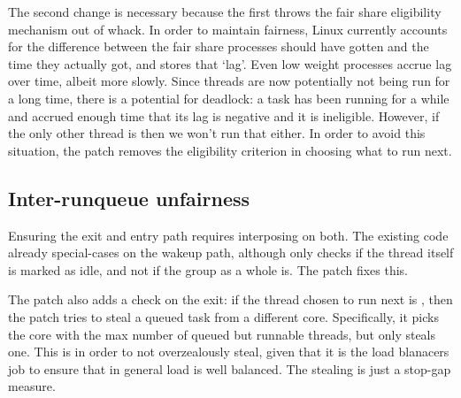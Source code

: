 The second change is necessary because the first throws the fair share
eligibility mechanism out of whack. In order to maintain fairness, Linux
currently accounts for the difference between the fair share processes should
have gotten and the time they actually got, and stores that `lag'. Even low
weight processes accrue lag over time, albeit more slowly. Since \schedbe{}
threads are now potentially not being run for a long time, there is a potential
for deadlock: a \schednormal{} task has been running for a while and accrued
enough time that its lag is negative and it is ineligible. However, if the only
other thread is \schedbe{} then we won't run that either. In order to avoid this
situation, the patch removes the eligibility criterion in choosing what to run
next.


\subsection{Inter-runqueue unfairness}


Ensuring the exit and entry path requires interposing on both. The existing code
already special-cases on the wakeup path, although only checks if the thread
itself is marked as idle, and not if the group as a whole is. The patch fixes this.

The patch also adds a check on the exit: if the thread chosen to run next is
\schedbe{}, then the patch tries to steal a queued \schednormal{} task from a
different core. Specifically, it picks the core with the max number of queued
but runnable \schednormal{} threads, but only steals one. This is in order to
not overzealously steal, given that it is the load blanacers job to ensure that
in general load is well balanced. The stealing is just a stop-gap measure.



